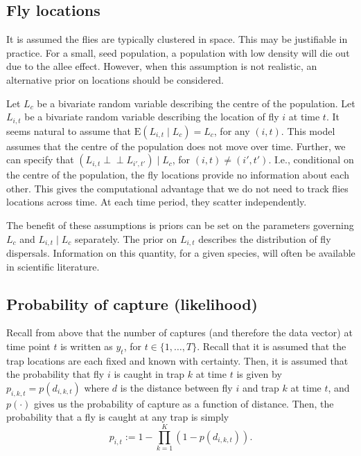 \documentclass[
]{book}
\begin{document}
\hypertarget{fly-locations}{%
\subsection{Fly locations}\label{fly-locations}}

It is assumed the flies are typically clustered in space. This may be justifiable in practice. For a small, seed population, a population with low density will die out due to the allee effect. However, when this assumption is not realistic, an alternative prior on locations should be considered.

Let \(L_c\) be a bivariate random variable describing the centre of the population. Let \(L_{i, t}\) be a bivariate random variable describing the location of fly \(i\) at time \(t\). It seems natural to assume that \(\mathrm E (L_{i, t} \mid L_c) = L_c\), for any \((i, t)\). This model assumes that the centre of the population does not move over time. Further, we can specify that \((L_{i, t} \perp \!\!\! \perp L_{i', t'}) \mid L_c\), for \((i, t) \neq (i', t')\). I.e., conditional on the centre of the population, the fly locations provide no information about each other. This gives the computational advantage that we do not need to track flies locations across time. At each time period, they scatter independently.

The benefit of these assumptions is priors can be set on the parameters governing \(L_c\) and \(L_{i, t} \mid L_c\) separately. The prior on \(L_{i, t}\) describes the distribution of fly dispersals. Information on this quantity, for a given species, will often be available in scientific literature.

\hypertarget{probability-of-capture-likelihood}{%
\subsection{Probability of capture (likelihood)}\label{probability-of-capture-likelihood}}

Recall from above that the number of captures (and therefore the data vector) at time point \(t\) is written as \(y_t\), for \(t \in \{1, \ldots, T\}\). Recall that it is assumed that the trap locations are each fixed and known with certainty. Then, it is assumed that the probability that fly \(i\) is caught in trap \(k\) at time \(t\) is given by \(p_{i, k, t} = p(d_{i, k, t})\) where \(d\) is the distance between fly \(i\) and trap \(k\) at time \(t\), and \(p(\cdot)\) gives us the probability of capture as a function of distance. Then, the probability that a fly is caught at any trap is simply
\[
p_{i, t} := 1 - \prod_{k=1}^K(1 - p(d_{i, k, t})).
\]
\end{document}

